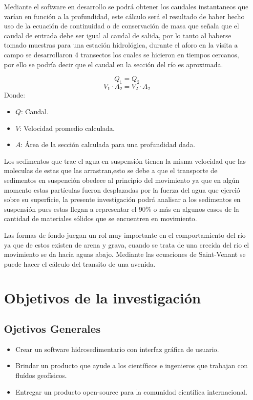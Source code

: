 \documentclass[12pt,a4paper]{report}
\begin{document}
Mediante el software en desarrollo se podrá obtener los caudales instantaneos que varían en función a la profundidad, este cálculo será el resultado de haber hecho uso de la ecuación de continuidad o de conservación de masa que señala que el caudal de entrada debe ser igual al caudal de salida, por lo tanto al haberse tomado muestras para una estación hidrológica, durante el aforo en la visita a campo se desarrollaron 4 transectos los cuales se hicieron en tiempos cercanos, por ello se podría decir que el caudal en la sección del río es aproximada.

$$Q_1 = Q_2$$
$$V_1\cdot A_2 =V_2\cdot A_2$$
Donde:
\begin{itemize}
\item $Q$: Caudal.
\item $V$: Velocidad promedio calculada.
\item $A$: Área de la sección calculada para una profundidad dada.
\end{itemize}

Los sedimentos que trae el agua en suspensión tienen la misma velocidad que las moleculas de estas que las arrastran,esto se debe a que el transporte de sedimentos en suspención obedece al principio del movimiento ya que en algún momento estas partículas fueron desplazadas por la fuerza del agua que ejerció sobre su superficie, la presente investigación podrá analisar a los sedimentos en suspensión pues estas llegan a representar el 90\% o más en algunos casos de la cantidad de materiales sólidos que se encuentren en movimiento.

Las formas de fondo juegan un rol muy importante en el comportamiento del rio ya que de estos existen de arena y grava, cuando se trata de una crecida del rio el movimiento se da hacia aguas abajo. Mediante las ecuaciones de Saint-Venant se puede hacer el cálculo del transito de una avenida.



	\section{Objetivos de la investigación}
	\subsection{Ojetivos Generales}
	\begin{itemize}
	\item Crear un software hidrosedimentario con interfaz gráfica de usuario.
	\item Brindar un producto que ayude a los científicos e ingenieros que trabajan con fluídos geofísicos.
	\item Entregar un producto open-source para la comunidad científica internacional.
	\end{itemize}
\end{document}
